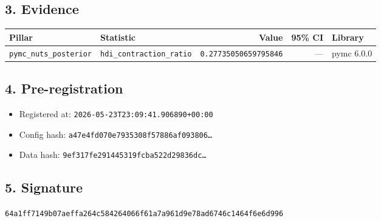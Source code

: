\documentclass{article}
\begin{document}
\subsection*{3. Evidence}
\begin{tabular}{llrrl}\toprule
\textbf{Pillar} & \textbf{Statistic} & \textbf{Value} & \textbf{95\% CI} & \textbf{Library} \\\midrule
\texttt{pymc\_nuts\_posterior} & \texttt{hdi\_contraction\_ratio} & \texttt{0.27735050659795846} & --- & pymc 6.0.0 \\
\bottomrule\end{tabular}
\subsection*{4. Pre-registration}
\begin{itemize}
\item Registered at: \texttt{2026-05-23T23:09:41.906890+00:00}
\item Config hash: \texttt{a47e4fd070e7935308f57886af093806\dots}
\item Data hash: \texttt{9ef317fe291445319fcba522d29836dc\dots}
\end{itemize}
\subsection*{5. Signature}
\texttt{64a1ff7149b07aeffa264c584264066f61a7a961d9e78ad6746c1464f6e6d996}\\
\end{document}
